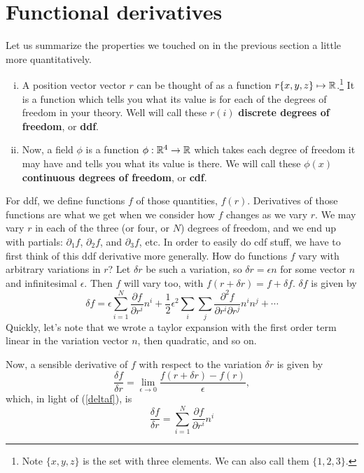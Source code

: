 \documentclass{book}
\begin{document}
\section{Functional derivatives}
Let us summarize the properties we touched on in the previous section a little more quantitatively.
\begin{enumerate} [(i)]
\item A position vector vector $r$ can be thought of as a function $r \{x,y,z\} \mapsto \mathbb{R}$.\footnote{Note $\{x,y,z\}$ is the set with three elements. We can also call them $\{1,2,3\}$.} It is a function which tells you what its value is for each of the degrees of freedom in your theory. Well will call these $r(i)$ \textbf{discrete degrees of freedom}, or \textbf{ddf}.

\item Now, a field $\phi$ is a function $ \phi: \mathbb{R}^4 \rightarrow \mathbb{R}$ which takes each degree of freedom it may have and tells you what its value is there. We will call these $\phi(x)$ \textbf{continuous degrees of freedom}, or \textbf{cdf}.
\end{enumerate}

For ddf, we define functions $f$ of those quantities, $f(r)$. Derivatives of those functions are what we get when we consider how $f$ changes as we vary $r$. We may vary $r$ in each of the three (or four, or $N$) degrees of freedom, and we end up with partials: $\partial_1 f$, $\partial_2 f$, and $\partial_3 f$, etc. In order to easily do cdf stuff, we have to first think of this ddf derivative more generally. How do functions $f$ vary with arbitrary variations in $r$? Let $\delta r$ be such a variation, so $\delta r = \epsilon n$ for some vector $n$ and infinitesimal $\epsilon$.
Then $f$ will vary too, with $f(r + \delta r) = f + \delta f$. $\delta f$ is given by
\begin{equation} \label{deltaf}
\delta f = \epsilon \sum_{i = 1}^N \frac{\partial f}{\partial r^i} n^i + \frac{1}{2} \epsilon^2 \sum_i \sum_j \frac{\partial^2 f}{\partial r^i \partial r^j} n^i n^j + \cdots
\end{equation}
Quickly, let's note that we wrote a taylor expansion with the first order term linear in the variation vector $n$, then quadratic, and so on.

Now, a sensible derivative of $f$ with respect to the variation $\delta r$ is given by
\[
\frac{\delta f}{\delta r} = \lim_{\epsilon \to 0} \frac{f(r + \delta r) - f(r)}{\epsilon},
\]
which, in light of (\ref{deltaf}), is
\begin{equation} \label{dfdr}
\boxed{\frac{\delta f}{\delta r} = \sum_{i = 1}^N \frac{\partial f}{\partial r^i} n^i}
\end{equation}
\end{document}
